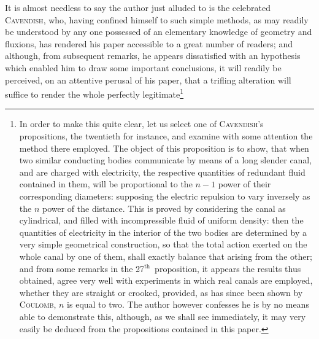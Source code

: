 \documentclass[11pt,notitlepage]{amsart}
\let\Person\textsc
\def\th{${}^\text{th}$\ }
\begin{document}
It is almost needless to say the author just alluded to is the celebrated
\Person{Cavendish}, who, having confined himself to such simple methods, as may
readily be understood by any one possessed of an elementary knowledge of
geometry and fluxions, has rendered his paper accessible to a great number
of readers; and although, from subsequent remarks, he appears dissatisfied
with an hypothesis which enabled him to draw some important conclusions,
it will readily be perceived, on an attentive perusal of his paper, that a trifling
alteration will suffice to render the whole perfectly legitimate\footnote{
In order to make this quite clear, let us select one of
\Person{Cavendish}'s propositions,
the twentieth for instance, and examine with some attention the method
there employed.
The object of this proposition is to show,
that when two similar conducting bodies communicate
by means of a long slender canal, and are charged with electricity,
the respective quantities of redundant fluid contained in them,
will be proportional to the $n-1$
power of their corresponding diameters:
supposing the electric repulsion to vary inversely
as the $n$ power of the distance.
This is proved by considering the canal as cylindrical,
and filled with incompressible fluid of uniform density:
then the quantities of electricity
in the interior of the two bodies are determined by a very simple
geometrical construction, so that the total action exerted
on the whole canal by one of them, shall exactly
balance that arising from the other; and from some remarks
in the 27\th proposition, it
appears the results thus obtained, agree very well with
experiments in which real canals
are employed, whether they are straight or crooked,
provided, as has since been shown
by \Person{Coulomb}, $n$ is equal to two.
The author however confesses he is by no means able
to demonstrate this, although, as we shall see immediately,
it may very easily be deduced
from the propositions contained in this paper.

}
\end{document}
